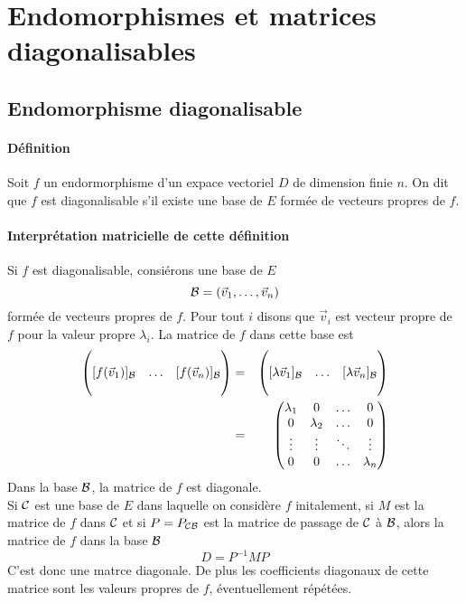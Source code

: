 %
%
\section{Endomorphismes et matrices diagonalisables}
%
%

%
\subsection{Endomorphisme diagonalisable}
%
\paragraph{Définition} Soit $f$ un endormorphisme d'un expace vectoriel $D$ de dimension finie $n$. On dit que $f$ est diagonalisable s'il existe une base de $E$ formée de vecteurs propres de $f$.

\paragraph{Interprétation matricielle de cette définition} Si $f$ est diagonalisable, consiérons une base de $E$ 
$$\mathcal{B} = (\vec{v}_1, \ldots, \vec{v}_n)$$
formée de vecteurs propres de $f$.  Pour tout $i$ disons que $\vec{v}_i$ est vecteur propre de $f$ pour la valeur propre $\lambda_i$. La matrice de $f$ dans cette base est
\begin{eqnarray*}
  \begin{pmatrix} \\ [f(\vec{v}_1)]_{\mathcal{B}} & \ldots & [f(\vec{v}_n)]_{\mathcal{B}} \\ \\ \end{pmatrix} &=& 
    \begin{pmatrix} \\ [\lambda \vec{v}_1]_{\mathcal{B}} & \ldots & [\lambda \vec{v}_n]_{\mathcal{B}} \\ \\ \end{pmatrix} \\
    &=& \begin{pmatrix} 
      \lambda_1 & 0 & \ldots & 0 \\
      0 & \lambda_2 & \ldots & 0 \\
      \vdots & \vdots & \ddots & \vdots \\
      0 & 0 & \ldots & \lambda_n \\
    \end{pmatrix}
\end{eqnarray*}
Dans la base $\mathcal{B}$, la matrice de $f$ est diagonale. \\
Si $\mathcal{C}$ est une base de $E$ dans laquelle on considère $f$ initalement, si $M$ est la matrice de $f$ dans $\mathcal{C}$ et si $P = P_{\mathcal{C} \mathcal{B}}$ est la matrice de passage de $\mathcal{C}$ à $\mathcal{B}$, alors la matrice de $f$ dans la base $\mathcal{B}$ 
$$D = P^{-1} M P$$
C'est donc une  matrce diagonale. De plus les coefficients diagonaux de cette matrice sont les valeurs propres de $f$, éventuellement répétées.

